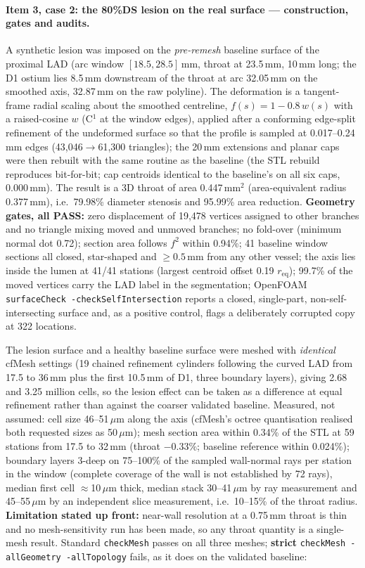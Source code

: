 \documentclass[11pt]{article}
\newcommand{\PASS}{\textcolor{passgreen}{\textbf{PASS}}}
\begin{document}
\paragraph{Item 3, case 2: the 80\%DS lesion on the real surface --- construction, gates and audits.}
\label{sec:lesion80-build}
A synthetic lesion was imposed on the \emph{pre-remesh} baseline surface of the proximal LAD (arc window
$[18.5,28.5]$\,mm, throat at 23.5\,mm, 10\,mm long; the D1 ostium lies 8.5\,mm downstream of the throat at arc 32.05\,mm on the
smoothed axis, 32.87\,mm on the raw polyline). The deformation is a tangent-frame radial scaling about the smoothed
centreline, $f(s)=1-0.8\,w(s)$ with a raised-cosine $w$ (C$^1$ at the window edges), applied after a conforming edge-split
refinement of the undeformed surface so that the profile is sampled at 0.017--0.24\,mm edges (43,046$\to$61,300
triangles); the 20\,mm extensions and planar caps were then rebuilt with the same routine as the baseline
(the STL rebuild reproduces bit-for-bit; cap centroids identical to the baseline's on all six caps, 0.000\,mm).
The result is a 3D throat of area 0.447\,mm$^2$ (area-equivalent radius 0.377\,mm), i.e.\ 79.98\% diameter stenosis and
95.99\% area reduction. \textbf{Geometry gates, all \PASS{}:} zero displacement of 19,478 vertices assigned to other branches
and no triangle mixing moved and unmoved branches; no fold-over (minimum normal dot 0.72); section area follows $f^2$ within 0.94\%;
41 baseline window sections all closed, star-shaped and $\geq0.5$\,mm from any other vessel; the axis lies inside the lumen at
41/41 stations (largest centroid offset 0.19 $r_\text{eq}$); 99.7\% of the moved vertices carry the LAD label in the segmentation;
OpenFOAM \texttt{surfaceCheck -checkSelfIntersection} reports a closed, single-part, non-self-intersecting surface and, as a positive control,
flags a deliberately corrupted copy at 322 locations.

The lesion surface and a healthy baseline surface were meshed with \emph{identical} cfMesh settings (19 chained refinement
cylinders following the curved LAD from 17.5 to 36\,mm plus the first 10.5\,mm of D1, three boundary layers), giving 2.68 and 3.25 million cells,
so the lesion effect can be taken as a difference at equal refinement rather than against the coarser validated baseline. Measured, not
assumed: cell size 46--51\,$\mu$m along the axis (cfMesh's octree quantisation realised both requested sizes as 50\,$\mu$m); mesh section area within 0.34\% of the STL at 59 stations from 17.5 to 32\,mm (throat $-0.33\%$; baseline reference within 0.024\%);
boundary layers 3-deep on 75--100\% of the sampled wall-normal rays per station in the window (complete coverage of the wall is not established by 72 rays), median first cell $\approx$10\,$\mu$m thick, median stack 30--41\,$\mu$m by ray measurement and
45--55\,$\mu$m by an independent slice measurement, i.e.\ 10--15\% of the throat radius. \textbf{Limitation stated up front:} near-wall resolution at a 0.75\,mm throat is thin and no mesh-sensitivity run has been made,
so any throat quantity is a single-mesh result. Standard \texttt{checkMesh} passes on all three meshes; \textbf{strict} \texttt{checkMesh -allGeometry -allTopology} fails, as it does on the validated
baseline:
\end{document}
